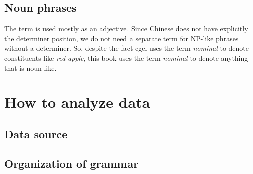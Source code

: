 \documentclass[../main.tex]{subfiles}
\begin{document}
\subsection{Noun phrases}

The term  is used mostly as an adjective. Since Chinese does not have 
explicitly the determiner position, we do not need a separate term for NP-like phrases without a determiner.
So, despite the fact \ac{cgel} uses the term \emph{nominal} to denote constituents like \emph{red apple}, 
this book uses the term \emph{nominal} to denote anything that is noun-like.

\section{How to analyze data}

\subsection{Data source}


\subsection{Organization of grammar}
\end{document}
